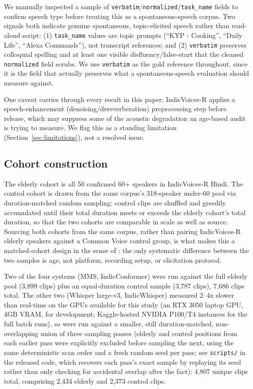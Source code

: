 \documentclass[11pt]{article}
\begin{document}
We manually inspected a sample of \texttt{verbatim}/\texttt{normalized}/\texttt{task\_name} fields
to confirm speech type before treating this as a spontaneous-speech corpus. Two signals both
indicate genuine spontaneous, topic-elicited speech rather than read-aloud script: (1)
\texttt{task\_name} values are topic prompts (``KYP - Cooking'', ``Daily Life'', ``Alexa
Commands''), not transcript references; and (2) \texttt{verbatim} preserves colloquial spelling
and at least one visible disfluency/false-start that the cleaned \texttt{normalized} field
scrubs. We use \texttt{verbatim} as the gold reference throughout, since it is the field that
actually preserves what a spontaneous-speech evaluation should measure against.

One caveat carries through every result in this paper: IndicVoices-R applies a speech-enhancement
(denoising/dereverberation) preprocessing step before release, which may suppress some of the
acoustic degradation an age-based audit is trying to measure. We flag this as a standing
limitation (Section~\ref{sec:limitations}), not a resolved issue.

\subsection{Cohort construction}
\label{sec:matching}

The elderly cohort is all 50 confirmed 60+ speakers in IndicVoices-R Hindi. The control cohort is
drawn from the same corpus's 318-speaker under-60 pool via duration-matched random sampling: control
clips are shuffled and greedily accumulated until their total duration meets or exceeds the
elderly cohort's total duration, so that the two cohorts are comparable in scale as well as
source. Sourcing both cohorts from the same corpus, rather than pairing IndicVoices-R elderly
speakers against a Common Voice control group, is what makes this a matched-cohort design in the
sense of \citet{koenecke2020racial}: the only systematic difference between the two samples is
age, not platform, recording setup, or elicitation protocol.

Two of the four systems (MMS, IndicConformer) were run against the full elderly pool (3,899
clips) plus an equal-duration control sample (3,787 clips), 7,686 clips total. The other two
(Whisper large-v3, IndicWhisper) measured 2--4x slower than real-time on the GPUs available for
this study (an RTX 3050 laptop GPU, 4GB VRAM, for development; Kaggle-hosted NVIDIA P100/T4
instances for the full batch runs), so were run against a smaller, still duration-matched,
non-overlapping union of
three sampling passes (elderly and control positions from each earlier pass were explicitly
excluded before sampling the next, using the same deterministic scan order and a fresh random
seed per pass; see \texttt{scripts/} in the released code, which recovers each pass's exact
sample by replaying its seed rather than only checking for accidental overlap after the fact):
4,807 unique clips total, comprising 2,434 elderly and 2,373 control clips.
\end{document}
